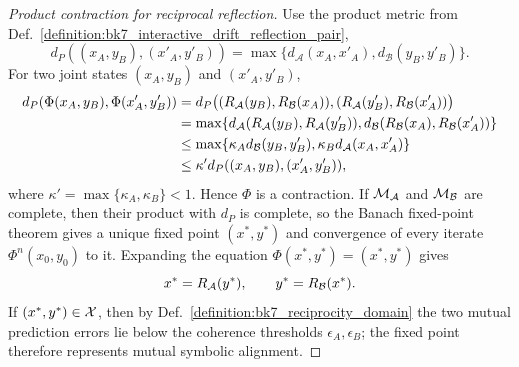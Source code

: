 \begin{proof}[Product contraction for reciprocal reflection]
\label{proof:bk7_two_way_street_convergence}
\leavevmode
Use the product metric from Def.~\ref{definition:bk7_interactive_drift_reflection_pair},
\[
d_P((x_A,y_B),(x'_A,y'_B))
=\max\{d_{\mathcal{A}}(x_A,x'_A),d_{\mathcal{B}}(y_B,y'_B)\}.
\]
For two joint states $(x_A,y_B)$ and $(x'_A,y'_B)$,
\begin{align*}
d_P(\Phi(x_A,y_B),\Phi(x'_A,y'_B))
&=d_P\bigl((R_{\mathcal{A}}(y_B),R_{\mathcal{B}}(x_A)),
(R_{\mathcal{A}}(y'_B),R_{\mathcal{B}}(x'_A))\bigr)\\
&=\max\{d_{\mathcal{A}}(R_{\mathcal{A}}(y_B),R_{\mathcal{A}}(y'_B)),
d_{\mathcal{B}}(R_{\mathcal{B}}(x_A),R_{\mathcal{B}}(x'_A))\}\\
&\leq \max\{\kappa_A d_{\mathcal{B}}(y_B,y'_B),
\kappa_B d_{\mathcal{A}}(x_A,x'_A)\}\\
&\leq \kappa' d_P((x_A,y_B),(x'_A,y'_B)),
\end{align*}
where $\kappa'=\max\{\kappa_A,\kappa_B\}<1$. Hence $\Phi$ is a contraction. If $\mathcal{M}_{\mathcal{A}}$ and $\mathcal{M}_{\mathcal{B}}$ are complete, then their product with $d_P$ is complete, so the Banach fixed-point theorem gives a unique fixed point $(x^*,y^*)$ and convergence of every iterate $\Phi^n(x_0,y_0)$ to it. Expanding the equation $\Phi(x^*,y^*)=(x^*,y^*)$ gives
\[
x^*=R_{\mathcal{A}}(y^*),
\qquad
y^*=R_{\mathcal{B}}(x^*).
\]
If $(x^*,y^*)\in\mathcal{X}$, then by Def.~\ref{definition:bk7_reciprocity_domain} the two mutual prediction errors lie below the coherence thresholds $\epsilon_A,\epsilon_B$; the fixed point therefore represents mutual symbolic alignment.
\end{proof}

